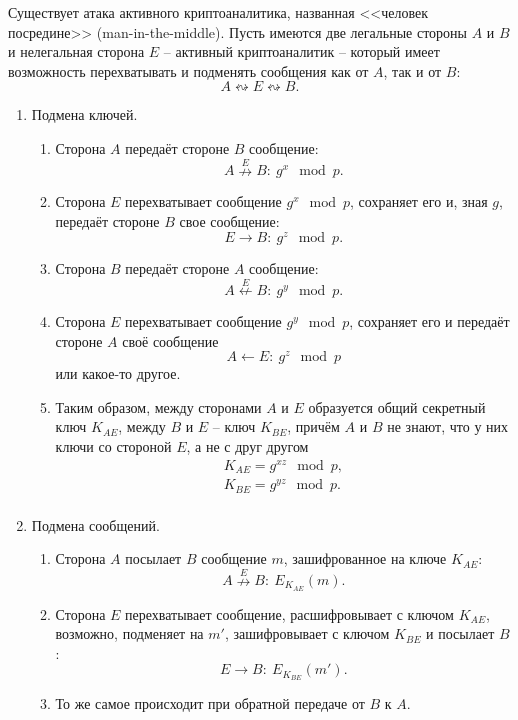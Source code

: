Существует атака активного криптоаналитика, названная <<человек посредине>> (man-in-the-middle). Пусть имеются две легальные стороны $A$ и $B$ и нелегальная сторона $E$ -- активный криптоаналитик -- который имеет возможность перехватывать и подменять сообщения как от $A$, так и от $B$:
    \[ A \leftrightsquigarrow E \leftrightsquigarrow B. \]

\begin{enumerate}
    \item Подмена ключей.
        \begin{enumerate}
            \item Сторона $A$ передаёт стороне $B$ сообщение:
                \[ A \overset{E}{\nrightarrow} B: ~ g^x \mod p. \]
            \item Сторона $E$ перехватывает сообщение $g^x \mod p$, сохраняет его и, зная $g$, передаёт стороне $B$ свое сообщение:
                \[ E \rightarrow B: ~ g^z \mod p. \]
            \item Сторона $B$ передаёт стороне $A$ сообщение:
                \[ A \overset{E}{\nleftarrow} B: ~ g^y \mod p. \]
            \item Сторона $E$ перехватывает сообщение $g^y \mod p$, сохраняет его и передаёт стороне $A$ своё сообщение
                \[ A \leftarrow E: ~ g^z \mod p \]
                или какое-то другое.
            \item Таким образом, между сторонами $A$ и $E$ образуется общий секретный ключ $K_{AE}$, между $B$ и $E$ -- ключ $K_{BE}$, причём $A$ и $B$ не знают, что у них ключи со стороной $E$, а не с друг другом
                \[ \begin{array} {l}
                    K_{AE} = g^{xz} \mod p, \\
                    K_{BE} = g^{yz} \mod p. \\
                \end{array} \]

        \end{enumerate}
    \item Подмена сообщений.
        \begin{enumerate}
            \item Сторона $A$ посылает $B$ сообщение $m$, зашифрованное на ключе $K_{AE}$:
                \[ A \overset{E}{\nrightarrow} B: ~ E_{K_{AE}}(m). \]
            \item Сторона $E$ перехватывает сообщение, расшифровывает с ключом $K_{AE}$, возможно, подменяет на $m'$, зашифровывает с ключом $K_{BE}$ и посылает $B$:
                \[ E \rightarrow B: ~ E_{K_{BE}}(m'). \]
            \item То же самое происходит при обратной передаче от $B$ к $A$.
        \end{enumerate}
\end{enumerate}

